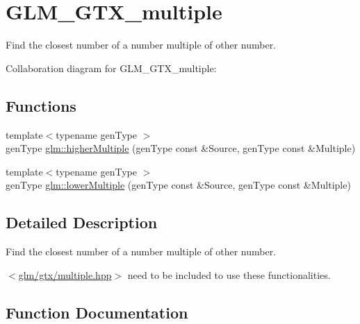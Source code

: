 \hypertarget{group__gtx__multiple}{}\section{G\+L\+M\+\_\+\+G\+T\+X\+\_\+multiple}
\label{group__gtx__multiple}


Find the closest number of a number multiple of other number.  


Collaboration diagram for G\+L\+M\+\_\+\+G\+T\+X\+\_\+multiple\+:
\subsection*{Functions}
\begin{DoxyCompactItemize}
\item 
{\footnotesize template$<$typename gen\+Type $>$ }\\gen\+Type \hyperlink{group__gtx__multiple_gaf83b1250f84ae5264a4c7df0a7f70b07}{glm\+::higher\+Multiple} (gen\+Type const \&Source, gen\+Type const \&Multiple)
\item 
{\footnotesize template$<$typename gen\+Type $>$ }\\gen\+Type \hyperlink{group__gtx__multiple_gaf3d38b5e3b560ad6245c33a1484c96e2}{glm\+::lower\+Multiple} (gen\+Type const \&Source, gen\+Type const \&Multiple)
\end{DoxyCompactItemize}


\subsection{Detailed Description}
Find the closest number of a number multiple of other number. 

$<$\hyperlink{multiple_8hpp}{glm/gtx/multiple.\+hpp}$>$ need to be included to use these functionalities. 

\subsection{Function Documentation}
\hypertarget{group__gtx__multiple_gaf83b1250f84ae5264a4c7df0a7f70b07}{}

